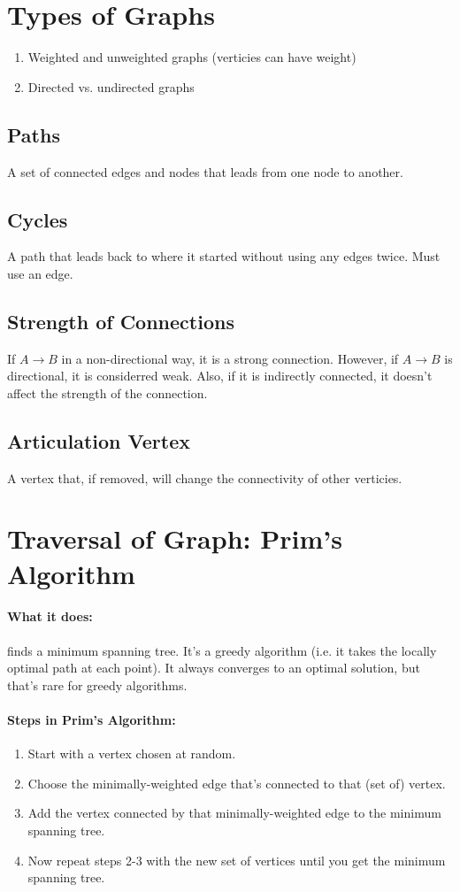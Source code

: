 \documentclass[a4paper,12pt]{report}
\begin{document}
\section{Types of Graphs}
\begin{enumerate}
\item Weighted and unweighted graphs (verticies can have weight)
\item Directed vs. undirected graphs
\end{enumerate}

\subsection{Paths}
A set of connected edges and nodes that leads from one node to another.

\subsection{Cycles}
A path that leads back to where it started without using any edges twice. Must use an edge.

\subsection{Strength of Connections}
If $A \to B$ in a non-directional way, it is a strong connection. However, if $A \to B$ is directional, it is considerred weak. Also, if it is indirectly connected, it doesn't affect the strength of the connection.

\subsection{Articulation Vertex}
A vertex that, if removed, will change the connectivity of other verticies.

\section{Traversal of Graph: Prim's Algorithm}
\paragraph{What it does: } finds a minimum spanning tree. It's a greedy algorithm (i.e. it takes the locally optimal path at each point). It always converges to an optimal solution, but that's rare for greedy algorithms. 

\paragraph{Steps in Prim's Algorithm: }
\begin{enumerate}
\item Start with a vertex chosen at random.
\item Choose the minimally-weighted edge that's connected to that (set of) vertex.
\item Add the vertex connected by that minimally-weighted edge to the minimum spanning tree.
\item Now repeat steps 2-3 with the new set of vertices until you get the minimum spanning tree.
\end{enumerate}
\end{document}
